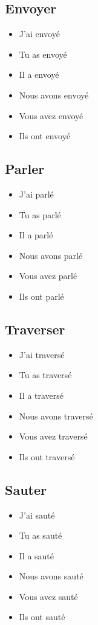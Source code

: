 \subsection{Envoyer}

\begin{itemize}
    \item J'ai envoyé
    \item Tu as envoyé
    \item Il a envoyé 
    \item Nous avons envoyé 
    \item Vous avez envoyé 
    \item Ils ont envoyé 
\end{itemize}

\subsection{Parler}

\begin{itemize}
    \item J'ai parlé
    \item Tu as parlé 
    \item Il a parlé 
    \item Nous avons parlé 
    \item Vous avez parlé 
    \item Ils ont parlé
\end{itemize}

\subsection{Traverser}

\begin{itemize}
    \item J'ai traversé
    \item Tu as traversé 
    \item Il a traversé 
    \item Nous avons traversé
    \item Vous avez traversé 
    \item Ils ont traversé 
\end{itemize}

\subsection{Sauter}

\begin{itemize}
    \item J'ai sauté 
    \item Tu as sauté 
    \item Il a sauté 
    \item Nous avons sauté 
    \item Vous avez sauté 
    \item Ils ont sauté
\end{itemize}


